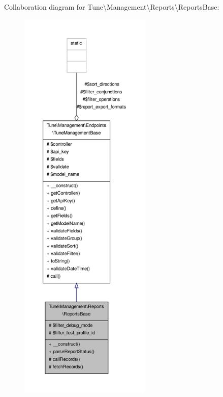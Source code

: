 Collaboration diagram for Tune\textbackslash{}Management\textbackslash{}Reports\textbackslash{}Reports\-Base\-:
\nopagebreak
\begin{figure}[H]
\begin{center}
\leavevmode
\includegraphics[height=550pt]{classTune_1_1Management_1_1Reports_1_1ReportsBase__coll__graph}
\end{center}
\end{figure}
